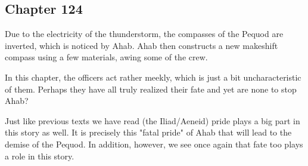 \subsection{Chapter 124}

Due to the electricity of the thunderstorm, the compasses of the Pequod are
inverted, which is noticed by Ahab. Ahab then constructs a new makeshift
compass using a few materials, awing some of the crew.

In this chapter, the officers act rather meekly, which is just a bit
uncharacteristic of them. Perhaps they have all truly realized their fate and
yet are none to stop Ahab?

Just like previous texts we have read (the Iliad/Aeneid) pride plays a big part
in this story as well. It is precisely this "fatal pride" of Ahab that will
lead to the demise of the Pequod. In addition, however, we see once again that
fate too plays a role in this story.
